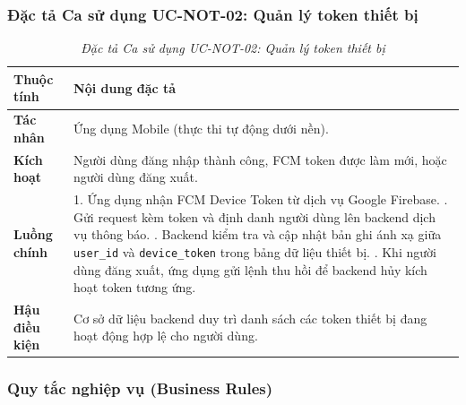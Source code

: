 \subsubsection{Đặc tả Ca sử dụng UC-NOT-02: Quản lý token thiết bị}

\begin{table}[H]
\centering
\renewcommand{\arraystretch}{1.25}
\begin{tabularx}{\textwidth}{|p{3.2cm}|X|}
\hline
\textbf{Thuộc tính} & \textbf{Nội dung đặc tả} \\
\hline
\textbf{Tác nhân} & Ứng dụng Mobile (thực thi tự động dưới nền). \\
\hline
\textbf{Kích hoạt} & Người dùng đăng nhập thành công, FCM token được làm mới, hoặc người dùng đăng xuất. \\
\hline
\textbf{Luồng chính} & 
1. Ứng dụng nhận FCM Device Token từ dịch vụ Google Firebase. \newline
2. Gửi request kèm token và định danh người dùng lên backend dịch vụ thông báo. \newline
3. Backend kiểm tra và cập nhật bản ghi ánh xạ giữa \texttt{user\_id} và \texttt{device\_token} trong bảng dữ liệu thiết bị. \newline
4. Khi người dùng đăng xuất, ứng dụng gửi lệnh thu hồi để backend hủy kích hoạt token tương ứng. \\
\hline
\textbf{Hậu điều kiện} & Cơ sở dữ liệu backend duy trì danh sách các token thiết bị đang hoạt động hợp lệ cho người dùng. \\
\hline
\end{tabularx}
\caption{\textit{Đặc tả Ca sử dụng UC-NOT-02: Quản lý token thiết bị}}
\label{tab:uc_not_02}
\end{table}

\subsubsection{Quy tắc nghiệp vụ (Business Rules)}

